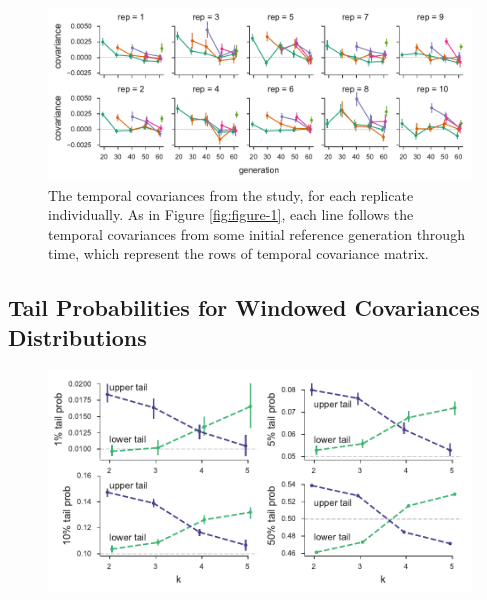 \documentclass[11pt]{article}
\begin{document}
\begin{figure}[!ht]
  \centering
  \includegraphics[]{figures/barghi-cov-panels.pdf}

  \caption{The temporal covariances from the \textcite{Barghi2019-qy} study,
  for each replicate individually. As in Figure \ref{fig:figure-1}, each line
  follows the temporal covariances from some initial reference generation through
  time, which represent the rows of temporal covariance matrix.}

  \label{suppfig:barghi-cov-panels}
\end{figure}



\subsection{\textcite{Barghi2019-qy} Tail Probabilities for Windowed Covariances Distributions}

\begin{figure}[!ht]
  \centering
  \includegraphics[]{figures/barghi-tailprobs-panels.pdf}
  \caption{}
  \label{suppfig:barghi-tailprobs-panels}
\end{figure}
\end{document}
